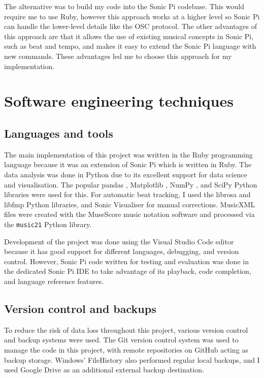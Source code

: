 \documentclass[12pt,twoside,openright]{report}
\begin{document}
The alternative was to build my code into the Sonic Pi codebase. This would
require me to use Ruby, however this approach works at a higher level so Sonic Pi can
handle the lower-level details like the OSC protocol. The other advantages of this approach are
that it allows the use of existing musical concepts in Sonic Pi, such as beat and
tempo, and makes it easy to extend the Sonic Pi language with new commands.
These advantages led me to choose this approach for my implementation.



\section{Software engineering techniques} \label{software_engineering_techniques}

\subsection{Languages and tools} \label{languages_and_tools}

The main implementation of this project was written in the Ruby programming
language because it was an extension of Sonic Pi which is written in Ruby. The
data analysis was done in Python due to its excellent support for data science
and visualisation. The popular pandas \cite{reback2020,mckinney2010}, Matplotlib \cite{hunter2007}, NumPy \cite{harris2020}, and SciPy \cite{virtanen2020} Python
libraries were used for this. For automatic beat tracking, I used the librosa \cite{mcfee2021} and libfmp \cite{mueller2021} Python libraries, and Sonic Visualiser \cite{cannam2010} for manual corrections.
MusicXML \cite{good2001} files were created with the MuseScore music notation software and
processed via the \verb'music21' \cite{cuthbert2010} Python library.

Development of the project was done using the Visual Studio Code editor because
it has good support for different languages, debugging, and version control.
However, Sonic Pi code written for testing and evaluation was done in the
dedicated Sonic Pi IDE to take advantage of its playback, code completion, and
language reference features.


\subsection{Version control and backups}

To reduce the risk of data loss throughout this project, various version control
and backup systems were used. The Git version control system was used to manage
the code in this project, with remote repositories on GitHub acting as backup
storage. Windows' FileHistory also performed regular local backups, and I used
Google Drive as an additional external backup destination.
\end{document}
